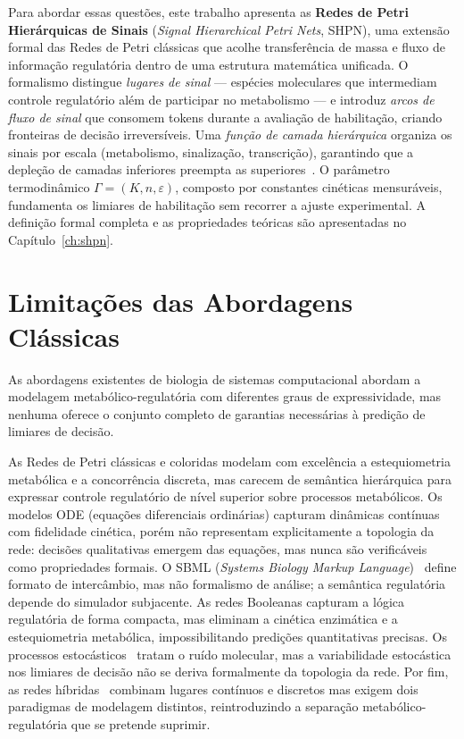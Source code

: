 Para abordar essas questões, este trabalho apresenta as \textbf{Redes de Petri
Hierárquicas de Sinais} (\textit{Signal Hierarchical Petri Nets}, SHPN), uma
extensão formal das Redes de Petri clássicas que acolhe transferência de massa
e fluxo de informação regulatória dentro de uma estrutura matemática unificada.
O formalismo distingue \emph{lugares de sinal} --- espécies moleculares que
intermediam controle regulatório além de participar no metabolismo --- e
introduz \emph{arcos de fluxo de sinal} que consomem tokens durante a
avaliação de habilitação, criando fronteiras de decisão irreversíveis.
Uma \emph{função de camada hierárquica} organiza os sinais por escala
(metabolismo, sinalização, transcrição), garantindo que a depleção de camadas
inferiores preempta as superiores~\cite{Simao2025HierarchicalPreemption}.
O parâmetro termodinâmico $\Gamma = (K, n, \varepsilon)$, composto por
constantes cinéticas mensuráveis, fundamenta os limiares de habilitação sem
recorrer a ajuste experimental.
A definição formal completa e as propriedades teóricas são apresentadas no
Capítulo~\ref{ch:shpn}.

\section{Limitações das Abordagens Clássicas}
\label{sec:limitacoes-classicas}

As abordagens existentes de biologia de sistemas computacional abordam a
modelagem metabólico-regulatória com diferentes graus de expressividade, mas
nenhuma oferece o conjunto completo de garantias necessárias à predição de
limiares de decisão.

As Redes de Petri clássicas e coloridas modelam com excelência a estequiometria
metabólica e a concorrência discreta, mas carecem de semântica hierárquica para
expressar controle regulatório de nível superior sobre processos metabólicos.
Os modelos ODE (equações diferenciais ordinárias) capturam dinâmicas contínuas
com fidelidade cinética, porém não representam explicitamente a topologia da
rede: decisões qualitativas emergem das equações, mas nunca são verificáveis como
propriedades formais. O SBML (\textit{Systems Biology Markup Language})~\cite{Hucka2003}
define formato de intercâmbio, mas não formalismo de análise; a semântica
regulatória depende do simulador subjacente. As redes Booleanas capturam a lógica
regulatória de forma compacta, mas eliminam a cinética enzimática e a
estequiometria metabólica, impossibilitando predições quantitativas precisas.
Os processos estocásticos~\cite{Gillespie1977,Goss1998} tratam o ruído
molecular, mas a variabilidade estocástica nos limiares de decisão não se deriva
formalmente da topologia da rede. Por fim, as redes híbridas~\cite{David1992}
combinam lugares contínuos e discretos mas exigem dois paradigmas de modelagem
distintos, reintroduzindo a separação metabólico-regulatória que se pretende
suprimir.

